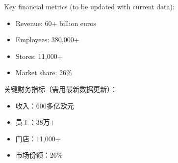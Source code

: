 Key financial metrics (to be updated with current data):
\begin{itemize}
    \item Revenue: 60+ billion euros
    \item Employees: 380,000+
    \item Stores: 11,000+
    \item Market share: 26\%
\end{itemize}

关键财务指标（需用最新数据更新）：
\begin{itemize}
    \item 收入：600多亿欧元
    \item 员工：38万+
    \item 门店：11,000+
    \item 市场份额：26\%
\end{itemize}
